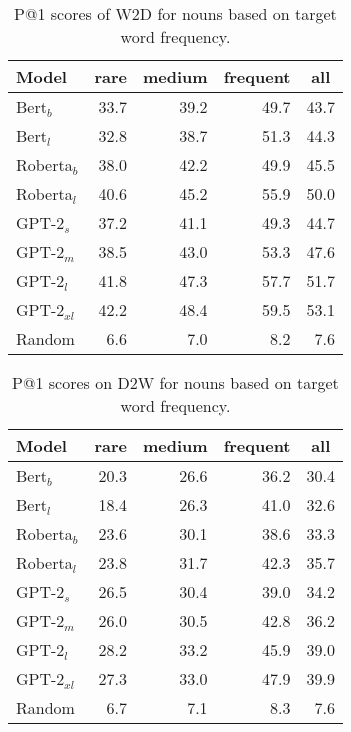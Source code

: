 \documentclass[11pt,a4paper]{article}
\begin{document}
\begin{table}
    \centering
    \begin{tabular}{l|rrrr}
    \hline
         \textbf{Model} & \multicolumn{1}{c}{\textbf{rare}} & \multicolumn{1}{c}{\textbf{medium}} & \multicolumn{1}{c}{\textbf{frequent}} & \multicolumn{1}{c}{\textbf{all}} \\ \hline
     Bert$_{b}$ & 33.7 & 39.2 & 49.7 & 43.7 \\
     Bert$_{l}$ & 32.8 & 38.7 & 51.3 & 44.3 \\
     Roberta$_{b}$ & 38.0 & 42.2 & 49.9 & 45.5 \\
     Roberta$_{l}$ & 40.6 & 45.2 & 55.9 & 50.0 \\ \hline
     GPT-2$_{s}$ & 37.2 & 41.1 & 49.3 & 44.7 \\
     GPT-2$_{m}$ & 38.5 & 43.0 & 53.3 & 47.6 \\
     GPT-2$_{l}$ & 41.8 & 47.3 & 57.7 & 51.7 \\
     GPT-2$_{xl}$ & 42.2 & 48.4 & 59.5 & 53.1 \\ \hline
     Random & 6.6 & 7.0 & 8.2 & 7.6 \\ \hline 
     
    \end{tabular}
    \caption{P@1 scores of W2D for nouns based on target word frequency.}
    \label{tab:freq_results_find_the_definition}
\end{table}


\begin{table}
    \centering
    \begin{tabular}{l|rrrr}
    \hline
        \textbf{Model} & \multicolumn{1}{c}{\textbf{rare}} & \multicolumn{1}{c}{\textbf{medium}} & \multicolumn{1}{c}{\textbf{frequent}} & \multicolumn{1}{c}{\textbf{all}} \\ \hline
     Bert$_{b}$ & 20.3 & 26.6 & 36.2 & 30.4 \\
     Bert$_{l}$ & 18.4 & 26.3 & 41.0 & 32.6 \\
     Roberta$_{b}$ & 23.6 & 30.1 & 38.6 & 33.3 \\
     Roberta$_{l}$ & 23.8 & 31.7 & 42.3 & 35.7 \\ \hline
     GPT-2$_{s}$ & 26.5 & 30.4 & 39.0 & 34.2 \\
     GPT-2$_{m}$ & 26.0 & 30.5 & 42.8 & 36.2 \\
     GPT-2$_{l}$ & 28.2 & 33.2 & 45.9 & 39.0 \\
     GPT-2$_{xl}$ & 27.3 & 33.0 & 47.9 & 39.9 \\ \hline
     Random & 6.7 & 7.1 & 8.3 & 7.6 \\ \hline 
     
    \end{tabular}
    \caption{P@1 scores on D2W for  nouns based on target word frequency.}
    \label{tab:freq_results_find_the_word}
\end{table}
\end{document}
